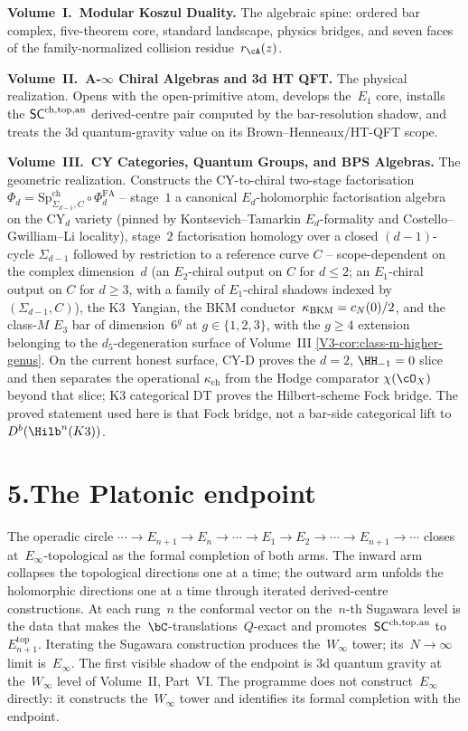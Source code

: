 \noindent\textbf{Volume~I.\ Modular Koszul Duality.}\enspace
The algebraic spine: ordered bar complex, five-theorem core,
standard landscape, physics bridges, and seven faces of the
family-normalized collision residue~$r_\cA(z)$.

\medskip

\noindent\textbf{Volume~II.\ A-$\infty$ Chiral Algebras and 3d HT
QFT.}\enspace
The physical realization. Opens with the open-primitive atom,
develops the~$E_1$ core, installs the
$\mathsf{SC}^{\mathrm{ch,top,an}}$ derived-centre pair computed by the bar-resolution shadow,
and treats the 3d quantum-gravity value on its Brown--Henneaux/HT-QFT
scope.

\medskip

\noindent\textbf{Volume~III.\ CY Categories, Quantum Groups, and BPS
Algebras.}\enspace
The geometric realization. Constructs the CY-to-chiral two-stage
factorisation
$\Phi_d = \mathrm{Sp}^{\mathrm{ch}}_{\Sigma_{d-1}, C} \circ
\Phi^{\mathrm{FA}}_d$ -- stage~$1$ a canonical $E_d$-holomorphic
factorisation algebra on the CY$_d$ variety (pinned by
Kontsevich--Tamarkin $E_d$-formality and Costello--Gwilliam--Li
locality), stage~$2$ factorisation homology over a closed
$(d-1)$-cycle $\Sigma_{d-1}$ followed by restriction to a reference
curve $C$ -- scope-dependent on the complex dimension~$d$ (an
$E_2$-chiral output on $C$ for $d\le 2$; an $E_1$-chiral output on
$C$ for $d\ge 3$, with a family of $E_1$-chiral shadows indexed by
$(\Sigma_{d-1}, C)$), the K3~Yangian,
the BKM conductor~$\kappa_{\mathrm{BKM}} = c_N(0)/2$, and the class-$M$ $E_3$ bar of
dimension~$6^g$ at $g\in\{1,2,3\}$, with the $g\ge 4$ extension
belonging to the $d_5$-degeneration surface of
Volume~III \ref{V3-cor:class-m-higher-genus}.
On the current honest surface, CY-D proves the $d=2$,
$\HH_{-1}=0$ slice and then separates the operational
$\kappa_{\mathrm{ch}}$ from the Hodge comparator
$\chi(\cO_X)$ beyond that slice; K3 categorical DT proves the
Hilbert-scheme Fock bridge. The proved statement used here is that
Fock bridge, not a bar-side categorical lift to
$D^b(\Hilb^n(K3))$.

\section*{5.\quad The Platonic endpoint}

\noindent
The operadic circle
$\cdots\to E_{n+1}\to E_n\to\cdots\to E_1\to E_2\to\cdots\to E_{n+1}\to\cdots$
closes at~$E_\infty$-topological as the formal completion of both
arms. The inward arm collapses the topological directions one at a
time; the outward arm unfolds the holomorphic directions one at a
time through iterated derived-centre constructions. At each rung~$n$
the conformal vector on the~$n$-th Sugawara level is the data that
makes the~$\bC$-translations~$Q$-exact and promotes~$\mathsf{SC}^{\mathrm{ch,top,an}}$
to~$E_{n+1}^{\mathrm{top}}$. Iterating the Sugawara construction
produces the~$W_\infty$ tower; its~$N\to\infty$ limit is~$E_\infty$.
The first visible shadow of the endpoint is 3d quantum gravity at
the~$W_\infty$ level of Volume~II, Part~VI. The programme does not
construct~$E_\infty$ directly: it constructs the~$W_\infty$ tower
and identifies its formal completion with the endpoint.

